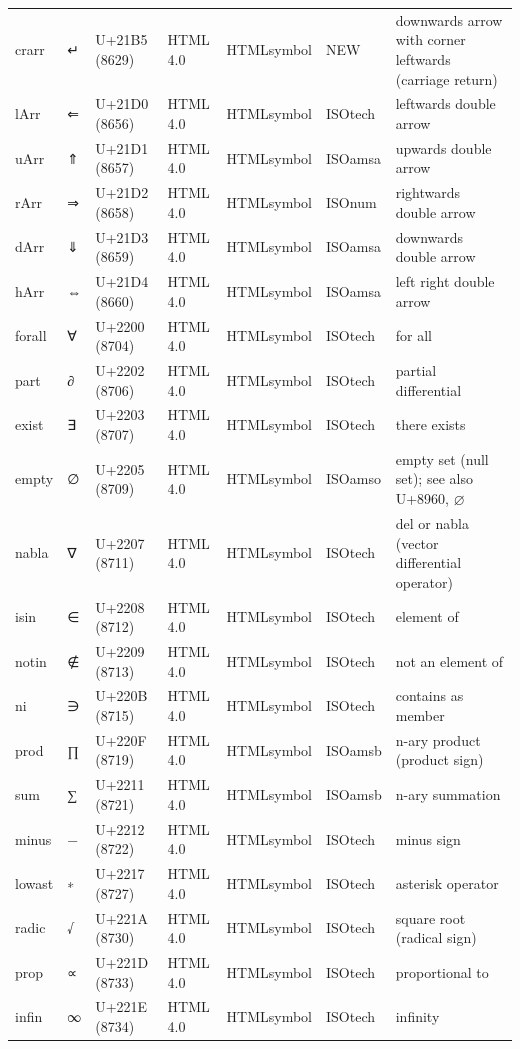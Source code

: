 \documentclass{article}
\begin{document}
\begin{tabular}{lllllll}
crarr & ↵ & U+21B5 (8629) & HTML 4.0 & HTMLsymbol & NEW & downwards arrow with corner leftwards (carriage return) \\
lArr & ⇐ & U+21D0 (8656) & HTML 4.0 & HTMLsymbol & ISOtech & leftwards double arrow \\
uArr & ⇑ & U+21D1 (8657) & HTML 4.0 & HTMLsymbol & ISOamsa & upwards double arrow \\
rArr & ⇒ & U+21D2 (8658) & HTML 4.0 & HTMLsymbol & ISOnum & rightwards double arrow \\
dArr & ⇓ & U+21D3 (8659) & HTML 4.0 & HTMLsymbol & ISOamsa & downwards double arrow \\
hArr & ⇔ & U+21D4 (8660) & HTML 4.0 & HTMLsymbol & ISOamsa & left right double arrow \\
forall & ∀ & U+2200 (8704) & HTML 4.0 & HTMLsymbol & ISOtech & for all \\
part & ∂ & U+2202 (8706) & HTML 4.0 & HTMLsymbol & ISOtech & partial differential \\
exist & ∃ & U+2203 (8707) & HTML 4.0 & HTMLsymbol & ISOtech & there exists \\
empty & ∅ & U+2205 (8709) & HTML 4.0 & HTMLsymbol & ISOamso & empty set (null set); see also U+8960, ⌀ \\
nabla & ∇ & U+2207 (8711) & HTML 4.0 & HTMLsymbol & ISOtech & del or nabla (vector differential operator) \\
isin & ∈ & U+2208 (8712) & HTML 4.0 & HTMLsymbol & ISOtech & element of \\
notin & ∉ & U+2209 (8713) & HTML 4.0 & HTMLsymbol & ISOtech & not an element of \\
ni & ∋ & U+220B (8715) & HTML 4.0 & HTMLsymbol & ISOtech & contains as member \\
prod & ∏ & U+220F (8719) & HTML 4.0 & HTMLsymbol & ISOamsb & n-ary product (product sign) \\
sum & ∑ & U+2211 (8721) & HTML 4.0 & HTMLsymbol & ISOamsb & n-ary summation \\
minus & − & U+2212 (8722) & HTML 4.0 & HTMLsymbol & ISOtech & minus sign \\
lowast & ∗ & U+2217 (8727) & HTML 4.0 & HTMLsymbol & ISOtech & asterisk operator \\
radic & √ & U+221A (8730) & HTML 4.0 & HTMLsymbol & ISOtech & square root (radical sign) \\
prop & ∝ & U+221D (8733) & HTML 4.0 & HTMLsymbol & ISOtech & proportional to \\
infin & ∞ & U+221E (8734) & HTML 4.0 & HTMLsymbol & ISOtech & infinity \\

\end{tabular}
\end{document}
